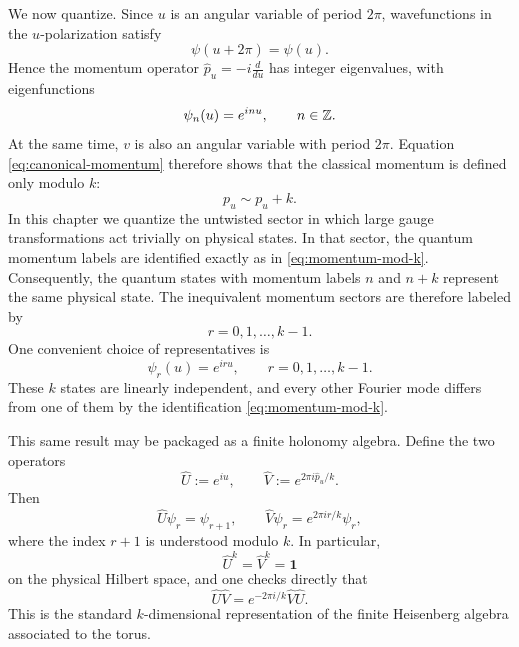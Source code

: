 \noindent We now quantize. Since $u$ is an angular variable of period $2\pi$, wavefunctions in the $u$-polarization satisfy
\begin{equation*}
\psi(u+2\pi) = \psi(u).
\end{equation*}
Hence the momentum operator $\hat p_u = -i\frac{d}{du}$ has integer eigenvalues, with eigenfunctions
\begin{equation}\label{eq:torus-basis-functions}
\psi_n(u) = e^{inu},
\qquad
n\in \mathbb{Z}.
\end{equation}
At the same time, $v$ is also an angular variable with period $2\pi$. Equation \eqref{eq:canonical-momentum} therefore shows that the classical momentum is defined only modulo $k$:
\begin{equation}\label{eq:momentum-mod-k}
p_u \sim p_u + k.
\end{equation}
In this chapter we quantize the untwisted sector in which large gauge transformations act trivially on physical states. In that sector, the quantum momentum labels are identified exactly as in \eqref{eq:momentum-mod-k}.
Consequently, the quantum states with momentum labels $n$ and $n+k$ represent the same physical state. The inequivalent momentum sectors are therefore labeled by
\begin{equation*}
r = 0,1,\ldots,k-1.
\end{equation*}
One convenient choice of representatives is
\begin{equation}\label{eq:torus-basis}
\psi_r(u) = e^{iru},
\qquad
r=0,1,\ldots,k-1.
\end{equation}
These $k$ states are linearly independent, and every other Fourier mode differs from one of them by the identification \eqref{eq:momentum-mod-k}.

\medskip

\noindent This same result may be packaged as a finite holonomy algebra. Define the two operators
\begin{equation}\label{eq:torus-UV}
\hat U := e^{iu},
\qquad
\hat V := e^{2\pi i \hat p_u/k}.
\end{equation}
Then
\begin{equation*}
\hat U\psi_r = \psi_{r+1},
\qquad
\hat V\psi_r = e^{2\pi i r/k}\psi_r,
\end{equation*}
where the index $r+1$ is understood modulo $k$. In particular,
\begin{equation*}
\hat U^k = \hat V^k = \mathbf{1}
\end{equation*}
on the physical Hilbert space, and one checks directly that
\begin{equation*}
\hat U\hat V = e^{-2\pi i/k}\hat V\hat U.
\end{equation*}
This is the standard $k$-dimensional representation of the finite Heisenberg algebra associated to the torus.

